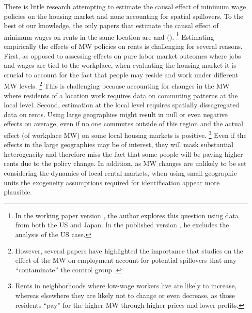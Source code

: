 
There is little research attempting to estimate the causal effect of minimum 
wage policies on the housing market and none accounting for spatial spillovers.
To the best of our knowledge, the only papers that estimate the causal effect of 
minimum wages on rents in the same location are \textcite{Tidemann2018} and 
\citeauthor{Yamagishi2019} (\citeyear{Yamagishi2019, Yamagishi2021}).%
\footnote{In the working paper version \parencite{Yamagishi2019}, the author 
explores this question using data from both the US and Japan.
In the published version \parencite{Yamagishi2021}, he excludes the analysis of 
the US case.}
Estimating empirically the effects of MW policies on rents is challenging for 
several reasons. 
First, as opposed to assessing effects on pure labor market outcomes where jobs 
and wages are tied to the workplace, when evaluating the housing market it is 
crucial to account for the fact that people may reside and work under different 
MW levels.%
\footnote{However, several papers have highlighted the importance that studies
on the effect of the MW on employment account for potential spillovers that may
``contaminate'' the control group \parencite{Kuehn2016, Huang2020}.}
This is challenging because accounting for changes in the MW where residents
of a location work requires data on commuting patterns at the local level.
Second, estimation at the local level requires spatially dissagregated data on 
rents.
Using large geographies might result in null or even negative effects on average,
even if no one commutes outside of this region and the actual effect (of workplace
MW) on some local housing markets is positive.%
\footnote{Rents in neighborhoods where low-wage workers live are likely to 
increase, whereas elsewhere they are likely not to change or even decrease, 
as those residents ``pay'' for the higher MW through higher prices and lower 
profits.}
Even if the effects in the large geographies may be of interest, they will mask 
substantial heterogeneity and therefore miss the fact that some people will be 
paying higher rents due to the policy change.
In addition, as MW changes are unlikely to be set considering the dynamics of 
local rental markets, when using small geographic units the exogeneity assumptions 
required for identification appear more plausible.


